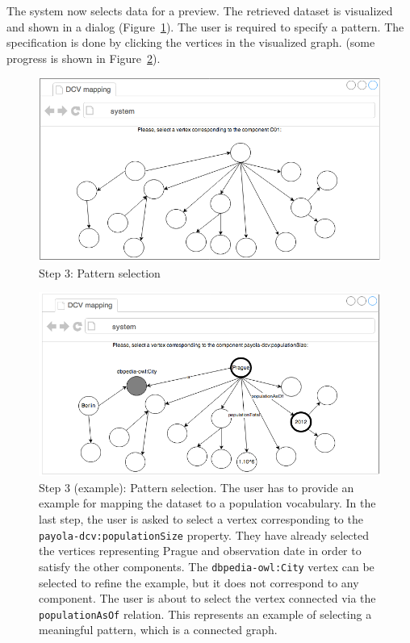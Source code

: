 The system now selects data for a preview. The retrieved dataset is 
visualized and shown in a dialog (Figure~\ref{fig:mockup-03}). The user is 
required to specify a pattern. The specification is done by clicking the vertices in 
the visualized graph. (some progress is shown in Figure~\ref{fig:mockup-05}).

\begin{figure}
	\centering
	\includegraphics[width=120mm]{img/mockup-03.png}
	\caption{Step 3: Pattern selection}
	\label{fig:mockup-03}
\end{figure}
\begin{figure}
	\centering
	\includegraphics[width=120mm]{img/mockup-05.png}
	\caption{Step 3 (example): Pattern selection. The user has to provide an example
	for mapping the dataset to a population vocabulary. In the last step, the user is asked
	to select a vertex corresponding to the \texttt{payola-dcv:populationSize} property.
	They have already selected the vertices representing Prague and observation date
	in order to satisfy the other components. The \texttt{dbpedia-owl:City} vertex can
	be selected to refine the example, but it does not correspond to any component.
	The user is about to select the vertex connected via the \texttt{populationAsOf} 
	relation. This represents an example of selecting a meaningful pattern, which 
	is a connected graph.}
	\label{fig:mockup-05}
\end{figure}

